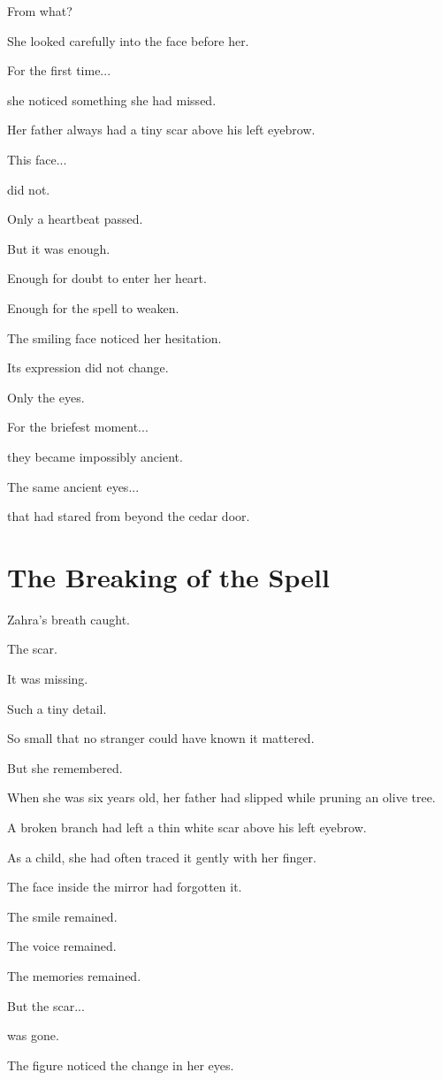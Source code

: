 \documentclass[12pt,openany]{book}
\begin{document}
From what?

She looked carefully into the face before her.

For the first time...

she noticed something she had missed.

Her father always had a tiny scar above his left eyebrow.

This face...

did not.

Only a heartbeat passed.

But it was enough.

Enough for doubt to enter her heart.

Enough for the spell to weaken.

The smiling face noticed her hesitation.

Its expression did not change.

Only the eyes.

For the briefest moment...

they became impossibly ancient.

The same ancient eyes...

that had stared from beyond the cedar door.
\section*{The Breaking of the Spell}

Zahra's breath caught.

The scar.

It was missing.

Such a tiny detail.

So small that no stranger could have known it mattered.

But she remembered.

When she was six years old, her father had slipped while pruning an olive tree.

A broken branch had left a thin white scar above his left eyebrow.

As a child, she had often traced it gently with her finger.

The face inside the mirror had forgotten it.

The smile remained.

The voice remained.

The memories remained.

But the scar...

was gone.

The figure noticed the change in her eyes.
\end{document}
